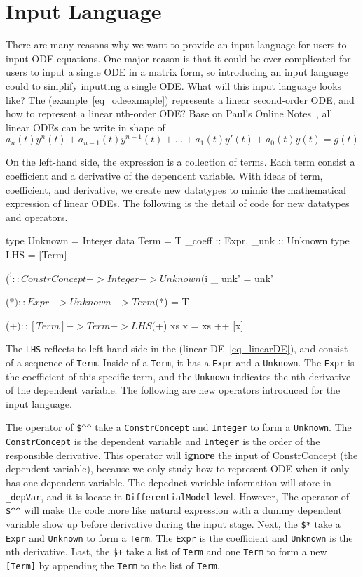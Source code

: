 \section{Input Language}
There are many reasons why we want to provide an input language for users to input ODE equations. One major reason is that it could be over complicated for users to input a single ODE in a matrix form, so introducing an input language could to simplify inputting a single ODE. What will this input language looks like? The (example~\ref{eq_odeexmaple}) represents a linear second-order ODE, and how to represent a linear nth-order ODE? Base on Paul's Online Notes~\citep{paullinearode}, all linear ODEs can be write in shape of 
\begin{equation} \label{eq_linearDE}
	a_n(t)y^n(t) + a_{n-1}(t)y^{n-1}(t) + \dots + a_1(t)y'(t) + a_0(t)y(t) = g(t)
\end{equation}

On the left-hand side, the expression is a collection of terms. Each term consist a coefficient and a derivative of the dependent variable. With ideas of term, coefficient, and derivative, we create new datatypes to mimic the mathematical expression of linear ODEs. The following is the detail of code for new datatypes and operators.

\begin{haskell1}
type Unknown = Integer
data Term = T{
	_coeff :: Expr,
	_unk :: Unknown
}
type LHS = [Term]

($^^) :: ConstrConcept -> Integer -> Unknown
($^^) _ unk' = unk'

($*) :: Expr -> Unknown -> Term
($*) = T

($+) :: [Term] -> Term -> LHS
($+) xs x  = xs ++ [x]
\end{haskell1}

The \verb|LHS| reflects to left-hand side in the (linear DE~\ref{eq_linearDE}), and consist of a sequence of \verb|Term|. Inside of a \verb|Term|, it has a \verb|Expr| and a \verb|Unknown|. The \verb|Expr| is the coefficient of this specific term, and the \verb|Unknown| indicates the nth derivative of the dependent variable. The following are new operators introduced for the input language.

The operator of \verb|$^^| take a \verb|ConstrConcept| and \verb|Integer| to form a \verb|Unknown|. The \verb|ConstrConcept| is the dependent variable and \verb|Integer| is the order of the responsible derivative. This operator will \textbf{ignore} the input of ConstrConcept (the dependent variable), because we only study how to represent ODE when it only has one dependent variable. The depednet variable information will store in \verb|_depVar|, and it is locate in \verb|DifferentialModel| level. However, The operator of \verb|$^^| will make the code more like natural expression with a dummy dependent variable show up before derivative during the input stage. Next, the \verb|$*| take a \verb|Expr| and \verb|Unknown| to form a \verb|Term|. The \verb|Expr| is the coefficient and \verb|Unknown| is the nth derivative. Last, the \verb|$+| take a list of \verb|Term| and one \verb|Term| to form a new \verb|[Term]| by appending the \verb|Term| to the list of \verb|Term|.

